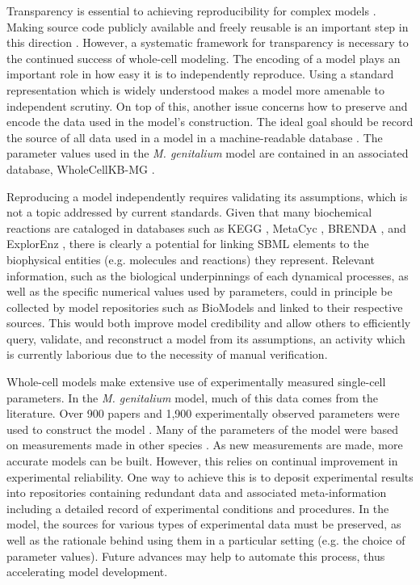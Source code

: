 \documentclass[journal,transmag,twoside]{IEEEtran}
\begin{document}
Transparency is essential to achieving reproducibility for complex models \cite{boulton2012open}.
Making source code publicly available and freely reusable is an important step in this direction \cite{easterbrook2014open}.
However, a systematic framework for transparency is necessary to the continued success of whole-cell modeling.
The encoding of a model plays an important role in how easy it is to independently reproduce.
Using a standard representation which is widely understood makes a model more amenable to
independent scrutiny.
On top of this, another issue concerns how to preserve and encode the data used in the
model's construction.
The ideal goal should be record the source of all data used in a model in a machine-readable database .
The parameter values used in the \textit{M. genitalium} model are contained in an associated database, WholeCellKB-MG \cite{karr2013wholecellkb}.

Reproducing a model independently requires validating its assumptions,
which is not a topic addressed by current standards.
Given that many biochemical reactions are cataloged in databases such as
KEGG \cite{kanehisa2000kegg}, MetaCyc \cite{caspi2008metacyc}, BRENDA \cite{schomburg2002brenda}, and
ExplorEnz \cite{mcdonald2009explorenz}, there is clearly a potential for
linking SBML elements to the biophysical entities (e.g. molecules and reactions) they represent.
Relevant information, such as the biological underpinnings
of each dynamical processes, as well as the specific numerical values used by parameters,
could in principle be collected by model repositories such as BioModels \cite{le2006biomodels}
and linked to their respective sources.
This would both improve model credibility and allow others to efficiently
query, validate, and reconstruct a model from its assumptions,
an activity which is currently laborious due to the necessity of manual verification.

Whole-cell models make extensive use of experimentally measured single-cell parameters.
In the \textit{M. genitalium} model, much of this data comes from the literature.
Over 900 papers and 1,900 experimentally observed parameters were used to construct the model \cite{Karr2012}.
Many of the parameters of the model were based on measurements made in other species \cite{macklin2014future}.
As new measurements are made, more accurate models can be built.
However, this relies on continual improvement in experimental reliability.
One way to achieve this is to deposit experimental results into repositories
containing redundant data and associated meta-information including
a detailed record of experimental conditions and procedures.
In the model, the sources for various types of experimental data must be preserved,
as well as the rationale behind using them in a particular setting
(e.g. the choice of parameter values).
Future advances may help to automate this process, thus accelerating model development.
\end{document}
